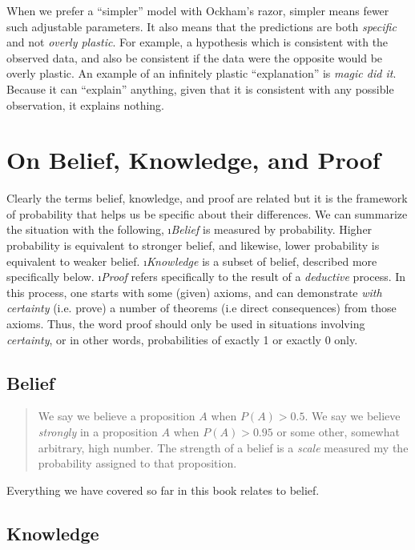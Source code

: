 When we prefer a ``simpler'' model with Ockham's razor, simpler means fewer such adjustable parameters.  It also means that the predictions are both {\em specific} and not {\em overly plastic}. For example, a hypothesis which is consistent with the observed data, and also be consistent if the data were the opposite would be overly plastic.  An example of an infinitely plastic ``explanation'' is {\em magic did it}.  Because it can ``explain'' anything, given that it is consistent with any possible observation, it explains nothing.


\section{On Belief, Knowledge, and Proof}

Clearly the terms belief, knowledge, and proof are related but it is the framework of probability that helps us be specific about their differences.  We can summarize the situation with the following,
\bi
\i \emph{Belief} is measured by probability.  Higher probability is equivalent to stronger belief, and likewise, lower probability is equivalent to weaker belief.
\i \emph{Knowledge} is a subset of belief, described more specifically below.
\i \emph{Proof} refers specifically to the result of a \emph{deductive} process.  In this process, one starts with some (given) axioms, and can demonstrate \emph{with certainty} (i.e. prove) a number of theorems (i.e direct consequences) from those axioms.  Thus, the word proof should only be used in situations involving \emph{certainty}, or in other words, probabilities of exactly 1 or exactly 0 only.
\ei

\subsection{Belief}

\begin{quote}
We say we believe a proposition $A$ when $P(A)>0.5$.  We say we
believe \emph{strongly} in a proposition $A$ when $P(A)>0.95$
or some other, somewhat arbitrary, high number.  The strength of a
belief is a \emph{scale} measured my the probability assigned to that proposition.
\end{quote}

Everything we have covered so far in this book relates to belief.

\subsection{Knowledge}

